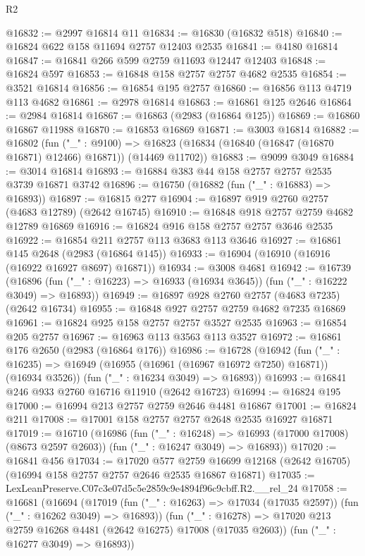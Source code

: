 \begin{lexlean}{R2}
\begin{coremodule}
@16832 := @2997 @16814 @11
@16834 := @16830 (@16832 @518)
@16840 := @16824 @622 @158 @11694 @2757 @12403 @2535
@16841 := @4180 @16814
@16847 := @16841 @266 @599 @2759 @11693 @12447 @12403
@16848 := @16824 @597
@16853 := @16848 @158 @2757 @2757 @4682 @2535
@16854 := @3521 @16814
@16856 := @16854 @195 @2757
@16860 := @16856 @113 @4719 @113 @4682
@16861 := @2978 @16814
@16863 := @16861 @125 @2646
@16864 := @2984 @16814
@16867 := @16863 (@2983 (@16864 @125))
@16869 := @16860 @16867 @11988
@16870 := @16853 @16869
@16871 := @3003 @16814
@16882 := @16802
    (fun ("_" : @9100) =>
    @16823 (@16834 (@16840 (@16847 (@16870 @16871) @12466) @16871)) (@14469 @11702))
@16883 := @9099 @3049
@16884 := @3014 @16814
@16893 := @16884 @383 @44 @158 @2757 @2757 @2535 @3739 @16871 @3742
@16896 := @16750 (@16882 (fun ("_" : @16883) => @16893))
@16897 := @16815 @277
@16904 := @16897 @919 @2760 @2757 (@4683 @12789) (@2642 @16745)
@16910 := @16848 @918 @2757 @2759 @4682 @12789 @16869
@16916 := @16824 @916 @158 @2757 @2757 @3646 @2535
@16922 := @16854 @211 @2757 @113 @3683 @113 @3646
@16927 := @16861 @145 @2648 (@2983 (@16864 @145))
@16933 := @16904 (@16910 (@16916 (@16922 @16927 @8697) @16871))
@16934 := @3008 @4681
@16942 := @16739
    (@16896 (fun ("_" : @16223) => @16933 (@16934 @3645)) (fun ("_" : @16222 @3049) => @16893))
@16949 := @16897 @928 @2760 @2757 (@4683 @7235) (@2642 @16734)
@16955 := @16848 @927 @2757 @2759 @4682 @7235 @16869
@16961 := @16824 @925 @158 @2757 @2757 @3527 @2535
@16963 := @16854 @205 @2757
@16967 := @16963 @113 @3563 @113 @3527
@16972 := @16861 @176 @2650 (@2983 (@16864 @176))
@16986 := @16728
    (@16942
      (fun ("_" : @16235) => @16949 (@16955 (@16961 (@16967 @16972 @7250) @16871)) (@16934 @3526))
      (fun ("_" : @16234 @3049) => @16893))
@16993 := @16841 @246 @933 @2760 @16716 @11910 (@2642 @16723)
@16994 := @16824 @195
@17000 := @16994 @213 @2757 @2759 @2646 @4481 @16867
@17001 := @16824 @211
@17008 := @17001 @158 @2757 @2757 @2648 @2535 @16927 @16871
@17019 := @16710
    (@16986
      (fun ("_" : @16248) => @16993 (@17000 @17008) (@8673 @2597 @2603))
      (fun ("_" : @16247 @3049) => @16893))
@17020 := @16841 @456
@17034 := @17020
    @577
    @2759
    @16699
    @12168
    (@2642 @16705)
    (@16994 @158 @2757 @2757 @2646 @2535 @16867 @16871)
@17035 := LexLeanPreserve.C07c3e07d5c5e2859c9e4894f96c9cbff.R2.__rel_24
@17058 := @16681
    (@16694
      (@17019 (fun ("_" : @16263) => @17034 (@17035 @2597)) (fun ("_" : @16262 @3049) => @16893))
      (fun ("_" : @16278) => @17020 @213 @2759 @16268 @4481 (@2642 @16275) @17008 (@17035 @2603))
      (fun ("_" : @16277 @3049) => @16893))

\end{coremodule}
\end{lexlean}
